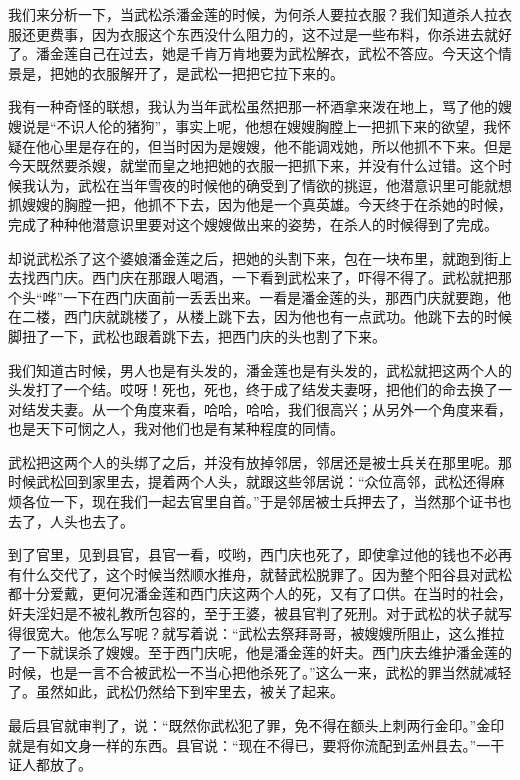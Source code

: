\par 我们来分析一下，当武松杀潘金莲的时候，为何杀人要拉衣服？我们知道杀人拉衣服还更费事，因为衣服这个东西没什么阻力的，这不过是一些布料，你杀进去就好了。潘金莲自己在过去，她是千肯万肯地要为武松解衣，武松不答应。今天这个情景是，把她的衣服解开了，是武松一把把它拉下来的。
\par 我有一种奇怪的联想，我认为当年武松虽然把那一杯酒拿来泼在地上，骂了他的嫂嫂说是“不识人伦的猪狗”，事实上呢，他想在嫂嫂胸膛上一把抓下来的欲望，我怀疑在他心里是存在的，但当时因为是嫂嫂，他不能调戏她，所以他抓不下来。但是今天既然要杀嫂，就堂而皇之地把她的衣服一把抓下来，并没有什么过错。这个时候我认为，武松在当年雪夜的时候他的确受到了情欲的挑逗，他潜意识里可能就想抓嫂嫂的胸膛一把，他抓不下去，因为他是一个真英雄。今天终于在杀她的时候，完成了种种他潜意识里要对这个嫂嫂做出来的姿势，在杀人的时候得到了完成。
\par 却说武松杀了这个婆娘潘金莲之后，把她的头割下来，包在一块布里，就跑到街上去找西门庆。西门庆在那跟人喝酒，一下看到武松来了，吓得不得了。武松就把那个头“哗”一下在西门庆面前一丢丢出来。一看是潘金莲的头，那西门庆就要跑，他在二楼，西门庆就跳楼了，从楼上跳下去，因为他也有一点武功。他跳下去的时候脚扭了一下，武松也跟着跳下去，把西门庆的头也割了下来。
\par 我们知道古时候，男人也是有头发的，潘金莲也是有头发的，武松就把这两个人的头发打了一个结。哎呀！死也，死也，终于成了结发夫妻呀，把他们的命去换了一对结发夫妻。从一个角度来看，哈哈，哈哈，我们很高兴；从另外一个角度来看，也是天下可悯之人，我对他们也是有某种程度的同情。
\par 武松把这两个人的头绑了之后，并没有放掉邻居，邻居还是被士兵关在那里呢。那时候武松回到家里去，提着两个人头，就跟这些邻居说：“众位高邻，武松还得麻烦各位一下，现在我们一起去官里自首。”于是邻居被士兵押去了，当然那个证书也去了，人头也去了。
\par 到了官里，见到县官，县官一看，哎哟，西门庆也死了，即使拿过他的钱也不必再有什么交代了，这个时候当然顺水推舟，就替武松脱罪了。因为整个阳谷县对武松都十分爱戴，更何况潘金莲和西门庆这两个人的死，又有了口供。在当时的社会，奸夫淫妇是不被礼教所包容的，至于王婆，被县官判了死刑。对于武松的状子就写得很宽大。他怎么写呢？就写着说：“武松去祭拜哥哥，被嫂嫂所阻止，这么推拉了一下就误杀了嫂嫂。至于西门庆呢，他是潘金莲的奸夫。西门庆去维护潘金莲的时候，也是一言不合被武松一不当心把他杀死了。”这么一来，武松的罪当然就减轻了。虽然如此，武松仍然给下到牢里去，被关了起来。
\par 最后县官就审判了，说：“既然你武松犯了罪，免不得在额头上刺两行金印。”金印就是有如文身一样的东西。县官说：“现在不得已，要将你流配到孟州县去。”一干证人都放了。
